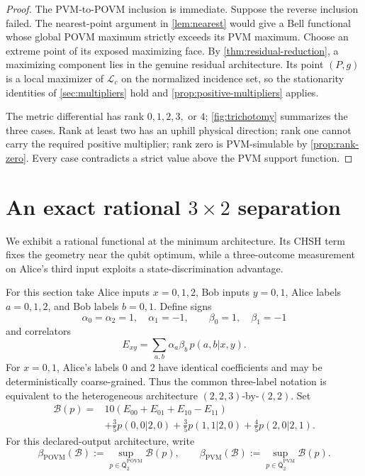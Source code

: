 \documentclass[11pt]{article}
\theoremstyle{definition}
\newcommand{\Qbar}{\overline{\mathsf Q}}
\newcommand{\POVM}{\mathrm{POVM}}
\newcommand{\PVM}{\mathrm{PVM}}
\newcommand{\Bell}{\mathcal B}
\begin{document}
\begin{proof}
The PVM-to-POVM inclusion is immediate. Suppose the reverse inclusion failed.
The nearest-point argument in \cref{lem:nearest} would give a Bell functional
whose global POVM maximum strictly exceeds its PVM maximum. Choose an extreme
point of its exposed maximizing face. By
\cref{thm:residual-reduction}, a maximizing component lies in the genuine
residual architecture. Its point \((P,g)\) is a local maximizer of
\(\mathcal L_c\) on the normalized incidence set, so the stationarity
identities of \cref{sec:multipliers} hold and
\cref{prop:positive-multipliers} applies.

The metric differential has rank \(0,1,2,3,\) or \(4\); \cref{fig:trichotomy}
summarizes the three cases. Rank at least two has
an uphill physical direction; rank one cannot carry the required positive
multiplier; rank zero is PVM-simulable by \cref{prop:rank-zero}. Every case
contradicts a strict value above the PVM support function.
\end{proof}

\section[An exact rational 3-by-2 separation]
{An exact rational \(3\times2\) separation}
\label{sec:separation}

We exhibit a rational functional at the minimum architecture. Its CHSH
term fixes the geometry near the qubit optimum, while a three-outcome
measurement on Alice's third input exploits a state-discrimination
advantage.

For this section take Alice inputs \(x=0,1,2\), Bob inputs \(y=0,1\), Alice
labels \(a=0,1,2\), and Bob labels \(b=0,1\). Define signs
\[
\alpha_0=\alpha_2=1,\quad\alpha_1=-1,\qquad
\beta_0=1,\quad\beta_1=-1
\]
and correlators
\[
E_{xy}=\sum_{a,b}\alpha_a\beta_b\,p(a,b|x,y).
\]
For \(x=0,1\), Alice's labels \(0\) and \(2\) have identical coefficients
and may be deterministically coarse-grained. Thus the common three-label
notation is equivalent to the heterogeneous architecture
\((2,2,3)\)-by-\((2,2)\).
Set
\begin{equation}
\label{eq:bell-functional}
\begin{aligned}
\Bell(p)={}&10(E_{00}+E_{01}+E_{10}-E_{11})\\
&+\frac35p(0,0|2,0)+\frac35p(1,1|2,0)
 +\frac45p(2,0|2,1).
\end{aligned}
\end{equation}
For this declared-output architecture, write
\[
\beta_{\POVM}(\Bell)
:=\sup_{p\in\Qbar^{\POVM}_2}\Bell(p),\qquad
\beta_{\PVM}(\Bell)
:=\sup_{p\in\Qbar^{\PVM}_2}\Bell(p).
\]
\end{document}
